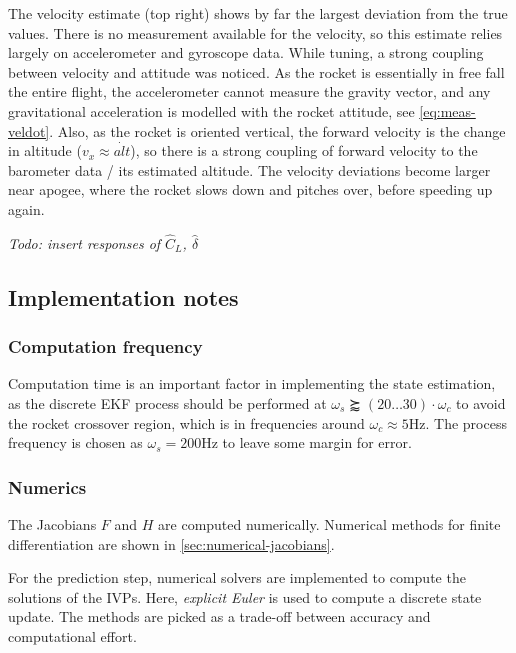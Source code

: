 The velocity estimate (top right) shows by far the largest deviation from the true values.
There is no measurement available for the velocity, so this estimate relies largely on accelerometer and gyroscope data.
While tuning, a strong coupling between velocity and attitude was noticed. 
As the rocket is essentially in free fall the entire flight, the accelerometer cannot measure the gravity vector, and any gravitational acceleration is modelled with the rocket attitude, see \autoref{eq:meas-veldot}.
Also, as the rocket is oriented vertical, the forward velocity is the change in altitude ($v_x \approx \dot {alt}$), so there is a strong coupling of forward velocity to the barometer data / its estimated altitude.
The velocity deviations become larger near apogee, where the rocket slows down and pitches over, before speeding up again.

\emph{Todo: insert responses of $\hat C_L$, $\hat \delta$}

\subsection{Implementation notes}
\label{sec:estimator-implementation}

\subsubsection{Computation frequency}
Computation time is an important factor in implementing the state estimation, as the discrete EKF process should be performed at $\omega_s \succapprox (20 \dots 30) \cdot \omega_c$ \cite{werner2021} to avoid the rocket crossover region, which is in frequencies around $ \omega_c \approx 5\mathrm{Hz}$.
The process frequency is chosen as $\omega_s = 200\mathrm{Hz}$ to leave some margin for error.

\subsubsection{Numerics}
The Jacobians $F$ and $H$ are computed numerically. 
Numerical methods for finite differentiation are shown in \autoref{sec:numerical-jacobians}.

For the prediction step, numerical solvers are implemented to compute the solutions of the IVPs.
Here, \textit{explicit Euler} is used to compute a discrete state update.
The methods are picked as a trade-off between accuracy and computational effort.

